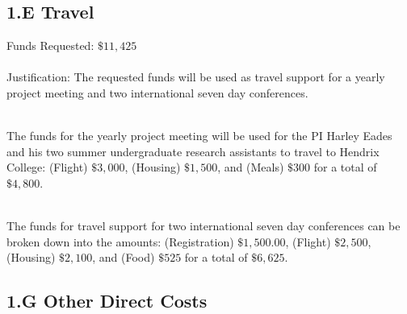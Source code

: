 \documentclass[11pt]{article}
\begin{document}
\subsection*{1.E Travel}
\label{subsec:travel}
Funds Requested: $\$11,425$\\ \ \\ Justification: The requested funds
will be used as travel support for a yearly project meeting and two
international seven day conferences.

\ \\ The funds for the yearly project meeting will be used for the PI
Harley Eades and his two summer undergraduate research assistants to
travel to Hendrix College: (Flight) $\$3,000$, (Housing) $\$1,500$,
and (Meals) $\$300$ for a total of $\$4,800$.

\ \\ The funds for travel support for two international seven day
conferences can be broken down into the amounts: (Registration) $\$1,500.00$,
(Flight) $\$2,500$, (Housing) $\$2,100$, and (Food) $\$525$ for a total of
$\$6,625$.  

\subsection*{1.G Other Direct Costs}
\label{subsec:other}
\end{document}
